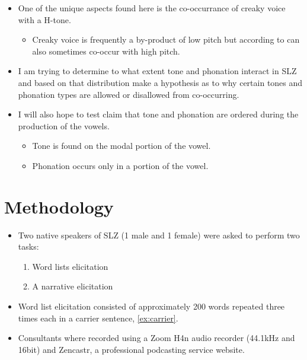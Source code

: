 \documentclass[12pt, letterpaper]{article}
\begin{document}
\begin{itemize}
	\item One of the unique aspects found here is the co-occurrance of creaky voice with a H-tone. 
		\begin{itemize}
			\item Creaky voice is frequently a by-product of low pitch but according to \citet{eslingVoiceQualityLaryngeal2019} can also sometimes co-occur with high pitch. 
		\end{itemize}
	\item I am trying to determine to what extent tone and phonation interact in SLZ and based on that distribution make a hypothesis as to why certain tones and phonation types are allowed or disallowed from co-occurring.
	\item I will also hope to test  claim that tone and phonation are ordered during the production of the vowels.
	\begin{itemize}
		\item Tone is found on the modal portion of the vowel.
		\item Phonation occurs only in a portion of the vowel.
	\end{itemize}
\end{itemize}

\section{Methodology} \label{sec:Methodology}
\begin{itemize}
	\item Two native speakers of SLZ (1 male and 1 female) were asked to perform two tasks: 	
	\begin{enumerate}
		\item Word lists elicitation
		\item A narrative elicitation
	\end{enumerate}

	\item Word list elicitation consisted of approximately 200 words repeated three times each in a carrier sentence, \ref{ex:carrier}. 
	\item Consultants where recorded using a Zoom H4n audio recorder (44.1kHz and 16bit) and Zencastr, a professional podcasting service website.
\end{itemize}
\end{document}
